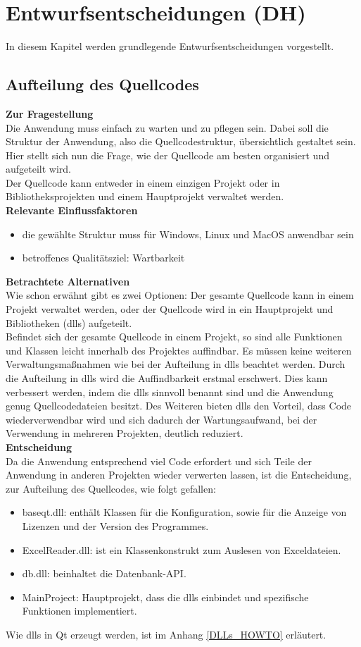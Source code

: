 \section{Entwurfsentscheidungen (DH)}
In diesem Kapitel werden grundlegende Entwurfsentscheidungen vorgestellt.

\subsection{Aufteilung des Quellcodes}
\textbf{Zur Fragestellung}\\
Die Anwendung muss einfach zu warten und zu pflegen sein. Dabei soll die Struktur der Anwendung, also die Quellcodestruktur, übersichtlich gestaltet sein. Hier stellt sich nun die Frage, wie der Quellcode am besten organisiert und aufgeteilt wird.\bigskip \\
Der Quellcode kann entweder in einem einzigen Projekt oder in Bibliotheksprojekten und einem Hauptprojekt verwaltet werden.\bigskip \\
\textbf{Relevante Einflussfaktoren}
\begin{itemize}
	\item die gewählte Struktur muss für Windows, Linux und MacOS anwendbar sein
	\item betroffenes Qualitätsziel: Wartbarkeit
\end{itemize}
\textbf{Betrachtete Alternativen}\\
Wie schon erwähnt gibt es zwei Optionen: Der gesamte Quellcode kann in einem Projekt verwaltet werden, oder der Quellcode wird in ein Hauptprojekt und Bibliotheken (dlls) aufgeteilt.\\
Befindet sich der gesamte Quellcode in einem Projekt, so sind alle Funktionen und Klassen leicht innerhalb des Projektes auffindbar. Es müssen keine weiteren Verwaltungsmaßnahmen wie bei der Aufteilung in dlls beachtet werden. Durch die Aufteilung in dlls wird die Auffindbarkeit erstmal erschwert. Dies kann verbessert werden, indem die dlls sinnvoll benannt sind und die Anwendung genug Quellcodedateien besitzt. Des Weiteren bieten dlls den Vorteil, dass Code wiederverwendbar wird und sich dadurch der Wartungsaufwand, bei der Verwendung in mehreren Projekten, deutlich reduziert.\bigskip \\
\textbf{Entscheidung}\\
Da die Anwendung entsprechend viel Code erfordert und sich Teile der Anwendung in anderen Projekten wieder verwerten lassen, ist die Entscheidung, zur Aufteilung des Quellcodes, wie folgt gefallen:
\begin{itemize}
	\item baseqt.dll: enthält Klassen für die Konfiguration, sowie für die Anzeige von Lizenzen und der Version des Programmes.
	\item ExcelReader.dll: ist ein Klassenkonstrukt zum Auslesen von Exceldateien.
	\item db.dll: beinhaltet die Datenbank-API.
	\item MainProject: Hauptprojekt, dass die dlls einbindet und spezifische Funktionen implementiert.
\end{itemize}
Wie dlls in Qt erzeugt werden, ist im Anhang \ref{DLLs_HOWTO} erläutert.